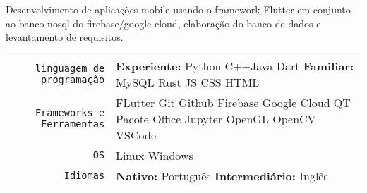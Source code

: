 \documentclass[
    10pt,
    A4,
    english,
    draft = false,
    twoside = false,
]{article}
\begin{document}
	{Desenvolvimento de aplicações mobile usando o framework Flutter em conjunto ao banco nosql do firebase/google cloud, elaboração do banco de dados e levantamento de requisitos.}
	\tab \begin{tabular}{r p{}}
	    \vspace{0.13cm}
		\texttt{\large linguagem de programação} & \textbf{Experiente:} Python \cvContactSep  C++\cvContactSep Java \cvContactSep Dart
		\tab \textbf{Familiar:} MySQL \cvContactSep Rust \cvContactSep JS \cvContactSep CSS \cvContactSep HTML \\
        \vspace{0.13cm}
		\texttt{\large Frameworks e Ferramentas} & FLutter \cvContactSep Git \cvContactSep Github \cvContactSep Firebase \cvContactSep Google Cloud \cvContactSep QT \cvContactSep Pacote Office \cvContactSep Jupyter \cvContactSep OpenGL \cvContactSep OpenCV \cvContactSep VSCode \\
		\vspace{0.13cm}
		\texttt{\large OS} & Linux \cvContactSep Windows \\
		\vspace{0.13cm}
		\texttt{\large Idiomas} & \textbf{Nativo:} Português \cvContactSep \textbf{Intermediário:} Inglês 
	\end{tabular}\\

	{}
	{}
	{}
	
\end{document}
